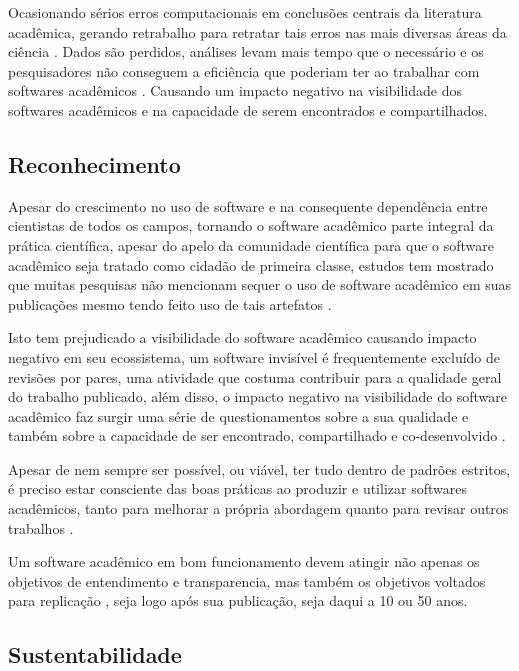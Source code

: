 Ocasionando sérios erros computacionais em conclusões centrais da literatura
acadêmica, gerando retrabalho para retratar tais erros nas mais diversas áreas
da ciência \cite{Merali2010Computational}. Dados são perdidos, análises levam
mais tempo que o necessário e os pesquisadores não conseguem a eficiência que
poderiam ter ao trabalhar com softwares acadêmicos \cite{wilson2017good}.
Causando um impacto negativo na visibilidade dos softwares acadêmicos
\cite{howison2013, katz2014transitive} e na capacidade de serem encontrados e
compartilhados.

\subsection{Reconhecimento}


Apesar do crescimento no uso de software e na consequente dependência entre
cientistas de todos os campos, tornando o software acadêmico parte integral da
prática científica, apesar do apelo da comunidade científica para que o
software acadêmico seja tratado como cidadão de primeira classe, estudos tem
mostrado que muitas pesquisas não mencionam sequer o uso de software acadêmico
em suas publicações mesmo tendo feito uso de tais artefatos
\cite{momcheva2015software} \cite{howison2016software}.

Isto tem prejudicado a visibilidade do software acadêmico causando impacto
negativo em seu ecossistema, um software invisível é frequentemente excluído de
revisões por pares, uma atividade que costuma contribuir para a qualidade geral
do trabalho publicado, além disso, o
impacto negativo na visibilidade do software acadêmico faz surgir uma
série de questionamentos sobre a sua qualidade e também sobre a
capacidade de ser encontrado, compartilhado e co-desenvolvido
\cite{howison2013, katz2014transitive} \cite{howison2016software}.

Apesar de nem sempre ser possível, ou viável, ter tudo dentro de padrões
estritos, é preciso estar consciente das boas práticas ao produzir e utilizar
softwares acadêmicos, tanto para melhorar a própria abordagem quanto para
revisar outros trabalhos \cite{wilson2014best}.

Um software acadêmico em bom funcionamento devem atingir não apenas os
objetivos de entendimento e transparencia, mas também os objetivos voltados
para replicação \cite{Stodden2010}, seja logo após sua publicação, seja daqui
a 10 ou 50 anos.

\subsection{Sustentabilidade}

